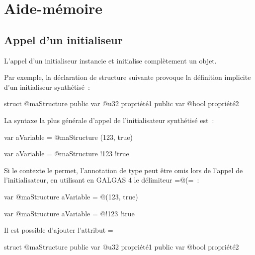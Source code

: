 
\chapter{Aide-mémoire}


\section{Appel d'un initialiseur}

L'appel d'un initialiseur instancie et initialise complètement un objet.

Par exemple, la déclaration de structure suivante provoque la définition implicite d'un initialiseur synthétisé~:
\begin{galgas4}
struct @maStructure {
  public var @u32 propriété1
  public var @bool propriété2
}
\end{galgas4}

La syntaxe la plus générale d'appel de l'initialisateur synthétisé est~:

\begin{galgas4}
var aVariable = @maStructure (123, true)
\end{galgas4}
\begin{galgas4}
var aVariable = @maStructure {!123 !true}
\end{galgas4}


Si le contexte le permet, l'annotation de type peut être omis lors de l'appel de l'initialisateur, en utilisant en GALGAS 4 le délimiteur \ggsq=@(=~:
\begin{galgas4}
var @maStructure aVariable = @(123, true)
\end{galgas4}
\begin{galgas4}
var @maStructure aVariable = @{!123 !true}
\end{galgas4}


Il est possible d'ajouter l'attribut \ggsq=%
\begin{galgas4}
struct @maStructure {
  public var @u32 propriété1 %
  public var @bool propriété2
}
\end{galgas4}

